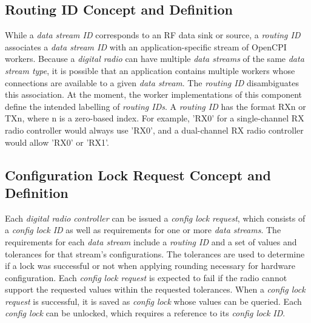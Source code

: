 \documentclass{article}
\begin{document}
  \subsection{Routing ID Concept and Definition}
    While a \textit{data stream ID} corresponds to an RF data sink or source,
    a \textit{routing ID}
    associates a \textit{data stream ID} with an application-specific stream of
    OpenCPI workers. Because a \textit{digital radio} can have multiple
    \textit{data streams} of the same
    \textit{data stream type},
    it is possible that an application contains multiple workers whose
    connections are available to a given \textit{data stream}. The
    \textit{routing ID} disambiguates this association. At the moment, the worker
    implementations of this component define the intended labelling of
    \textit{routing IDs}. A \textit{routing ID} has the format RXn or TXn, where n is
    a zero-based index. For example, 'RX0' for
    a single-channel RX radio controller would always use 'RX0', and a
    dual-channel RX radio controller would allow 'RX0' or 'RX1'.

  \subsection{Configuration Lock Request Concept and Definition}
    Each \textit{digital radio controller}
    can be issued a \textit{config lock request}, which
    consists of a \textit{config lock ID} as well as
    requirements for one or more
    \textit{data streams}. The requirements for each \textit{data stream}
    include
    a \textit{routing ID} and a set of values and tolerances for that stream's
    configurations. The tolerances are used to determine
    if a lock was successful or not when applying rounding necessary for
    hardware configuration. Each \textit{config lock request} is expected to
    fail if the radio cannot support the requested values within the requested
    tolerances. When a \textit{config lock request} is successful, it is saved
    as
    \textit{config lock} whose values can be queried. Each \textit{config lock}
    can be
    unlocked, which requires a reference to its \textit{config lock ID}.
\end{document}
